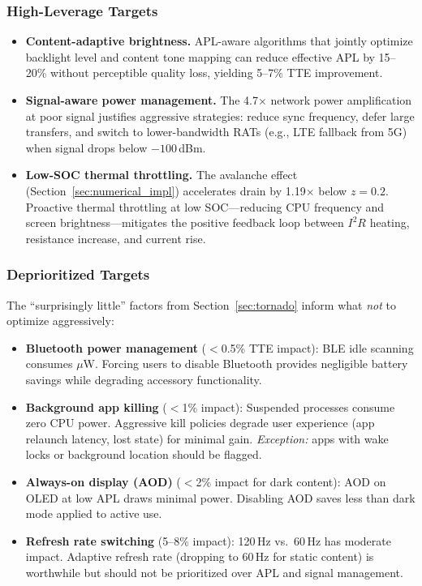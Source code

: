 \documentclass{mcmthesis}
\begin{document}
\subsubsection{High-Leverage Targets}

\begin{itemize}[noitemsep]
  \item \textbf{Content-adaptive brightness.} APL-aware algorithms that jointly optimize backlight level and content tone mapping can reduce effective APL by 15--20\% without perceptible quality loss, yielding 5--7\% TTE improvement.
  \item \textbf{Signal-aware power management.} The 4.7$\times$ network power amplification at poor signal justifies aggressive strategies: reduce sync frequency, defer large transfers, and switch to lower-bandwidth RATs (e.g., LTE fallback from 5G) when signal drops below $-100$\,dBm.
  \item \textbf{Low-SOC thermal throttling.} The avalanche effect (Section~\ref{sec:numerical_impl}) accelerates drain by 1.19$\times$ below $z = 0.2$. Proactive thermal throttling at low SOC---reducing CPU frequency and screen brightness---mitigates the positive feedback loop between $I^2R$ heating, resistance increase, and current rise.
\end{itemize}

\subsubsection{Deprioritized Targets}

The ``surprisingly little'' factors from Section~\ref{sec:tornado} inform what \emph{not} to optimize aggressively:

\begin{itemize}[noitemsep]
  \item \textbf{Bluetooth power management} ($<$0.5\% TTE impact): BLE idle scanning consumes $\mu$W. Forcing users to disable Bluetooth provides negligible battery savings while degrading accessory functionality.
  \item \textbf{Background app killing} ($<$1\% impact): Suspended processes consume zero CPU power. Aggressive kill policies degrade user experience (app relaunch latency, lost state) for minimal gain. \emph{Exception:} apps with wake locks or background location should be flagged.
  \item \textbf{Always-on display (AOD)} ($<$2\% impact for dark content): AOD on OLED at low APL draws minimal power. Disabling AOD saves less than dark mode applied to active use.
  \item \textbf{Refresh rate switching} (5--8\% impact): 120\,Hz vs.\ 60\,Hz has moderate impact. Adaptive refresh rate (dropping to 60\,Hz for static content) is worthwhile but should not be prioritized over APL and signal management.
\end{itemize}
\end{document}
